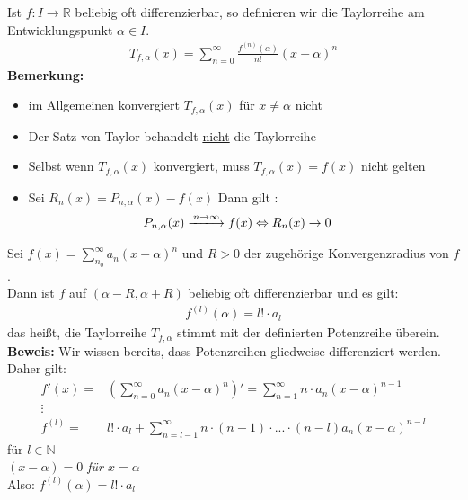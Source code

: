 \begin{Definition}{
	Ist $f: I \rightarrow \mathbb{R}$ beliebig oft differenzierbar, so definieren 
	wir die Taylorreihe am Entwicklungspunkt $\alpha \in I$.
	\begin{align*}
		T_{f, \alpha} (x) = \sum_{n = 0}^{\infty} \frac{f^{(n)}(\alpha)}{n!}
		(x- \alpha)^n
	\end{align*}
	\textbf{Bemerkung:} 
	\begin{itemize}
		\item im Allgemeinen konvergiert $T_{f,\alpha}(x)$ für $x \neq \alpha$ nicht
		\item Der Satz von Taylor behandelt \underline{nicht} die Taylorreihe
		\item Selbst wenn $T_{f, \alpha}(x)$ konvergiert, muss 
		$T_{f,\alpha}(x) = f(x)$ nicht gelten
		\item Sei $R_n(x) = P_{n, \alpha}(x) -f(x)$ Dann gilt :
		\begin{align*}
			P_{n,\alpha}(x) \xlongrightarrow{n \rightarrow \infty} f(x) 
			& \Leftrightarrow  R_n (x) \rightarrow 0
		\end{align*}
	\end{itemize}
}\end{Definition}

\begin{Satz}{
	Sei $f(x) = \sum_{n_0}^{\infty} a_n (x- \alpha)^n $ und $R > 0$ der zugehörige 
	Konvergenzradius von $f$.\\
	Dann ist $f$ auf $(\alpha -R, \alpha + R)$ beliebig oft differenzierbar und 
	es gilt:
	\begin{align*}
		f^{(l)}(\alpha) = l ! \cdot a_l
	\end{align*}
	das heißt, die Taylorreihe $T_{f,\alpha}$ stimmt mit der definierten 
	Potenzreihe überein.
	\\
	\textbf{Beweis:} Wir wissen bereits, dass Potenzreihen gliedweise differenziert
	 werden. Daher gilt: 
	 \begin{align*}
	 	f'(x) = & \left( \sum_{n = 0}^{\infty} a_n (x- \alpha)^n \right) '
	 	 =  \sum_{n= 1}^{\infty}n \cdot a_n (x- \alpha)^{n-1} \\
	 	\vdots \\
	 	f^{(l)} = & l! \cdot a_l + \sum_{n = l-1}^{\infty} n \cdot (n-1) \cdot 
	 	... \cdot (n-l) a_n(x-\alpha)^{n-l}
	 \end{align*}
	 für $l \in \mathbb{N}$ \\
	 \textit{$(x - \alpha) = 0$ für $x = \alpha$}\\
	 Also: $f^{(l)}(\alpha) = l! \cdot a_l$
}\end{Satz}

